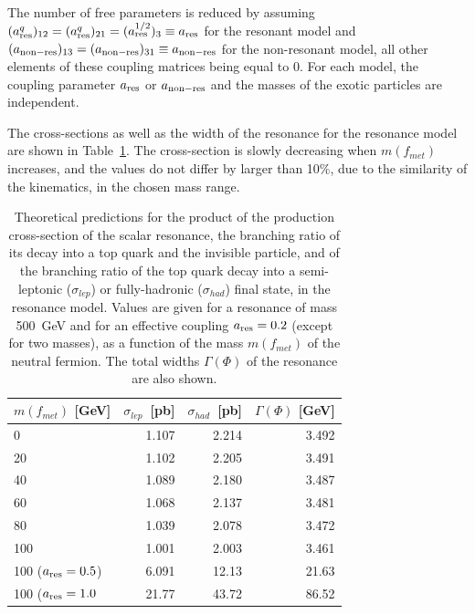 The number of free parameters is reduced by assuming $(a_{\mathrm{res}}^q)_{\mathrm{12}}=(a_{\mathrm{res}}^q)_{\mathrm{21}}=(a_{\mathrm{res}}^{1/2})_{\mathrm{3}}\equiv a_{\mathrm{res}}$
for the resonant model and $(a_{\mathrm{non-res}})_{\mathrm{13}}=(a_{\mathrm{non-res}})_{\mathrm{31}}\equiv a_{\mathrm{non-res}}$ for the non-resonant model,
all other elements of these coupling matrices being equal to 0.
For each model, the coupling parameter $a_{\mathrm{res}}$ or $a_{\mathrm{non-res}}$ and the masses of the exotic particles are independent.

The cross-sections as well as the width of the resonance for the resonance model are shown in Table~\ref{tab:S1R_Xsec}.  
The cross-section is slowly decreasing when $m(f_{met})$ increases,
and the values do not differ by larger than 10\%, due to the similarity of the kinematics, in the chosen mass range.
\begin{table}[!htb]\centering
\begin{tabular}{l|r|r|r}
\hline \hline
$m(f_{met})$ [GeV] & $\sigma_{lep}$~[pb] & $\sigma_{had}$~[pb] & $\Gamma(\Phi)$ [GeV]   \\
\hline \hline
0                        &  1.107              & 2.214               &  3.492  \\
20                       &  1.102              & 2.205               &  3.491  \\
40                       &  1.089              & 2.180               &  3.487  \\
60                       &  1.068              & 2.137               &  3.481 \\	
80                       &  1.039              & 2.078               &  3.472  \\
100                      &  1.001              & 2.003               &  3.461  \\
100 ($a_{\mathrm{res}}=0.5$) &  6.091              &  12.13              & 21.63    \\
100 ($a_{\mathrm{res}}=1.0$  &  21.77              &  43.72              &  86.52   \\
\hline \hline
\end{tabular}
\caption
{
Theoretical predictions for the product of the production cross-section of the
scalar resonance, the branching ratio of its decay into a top quark and the invisible particle,
and of the branching ratio of the top quark decay into a semi-leptonic ($\sigma_{lep}$) or fully-hadronic ($\sigma_{had}$) final state,
in the resonance model.
Values are given for a resonance of mass 500~GeV and for an effective coupling $a_{\mathrm{res}}=0.2$ (except for two masses),
as a function of the mass $m(f_{met})$ of the neutral fermion.
The total widths $\Gamma(\Phi)$ of the resonance are also shown.
}
\label{tab:S1R_Xsec}
\end{table}


